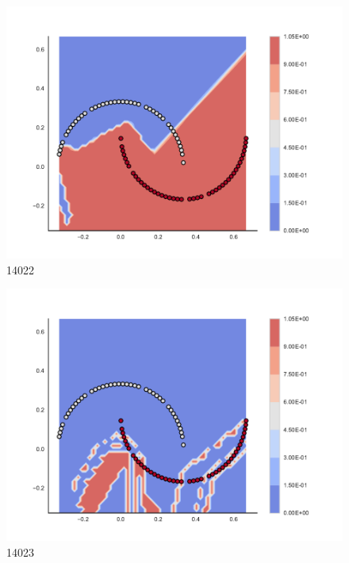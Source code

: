 \begin{subfigure}[b]{0.09\textwidth}
    \includegraphics[clip, trim=2.35cm 1.75cm 4.5cm 0cm,width=\textwidth]{img/convergence/14022.pdf}
    \caption{14022}
    \label{fig:convergence_14022}
\end{subfigure}
%
\begin{subfigure}[b]{0.09\textwidth}
    \includegraphics[clip, trim=2.35cm 1.75cm 4.5cm 0cm,width=\textwidth]{img/convergence/14023.pdf}
    \caption{14023}
    \label{fig:convergence_14023}
\end{subfigure}
%
